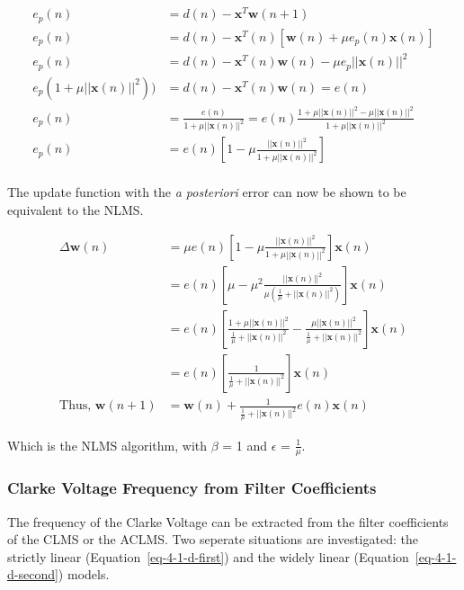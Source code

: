 \documentclass[main.tex]{subfiles}
\begin{document}
\begin{align*}
e_p(n) &= d(n) - \textbf{x}^T\textbf{w}(n+1)\\
e_p(n) &= d(n) - \textbf{x}^T(n)\left[\textbf{w}(n)+\mu e_p(n)\textbf{x}(n)\right]\\
e_p(n) &= d(n) - \textbf{x}^T(n)\textbf{w}(n) - \mu e_p||\textbf{x}(n)||^2\\
e_p(1+\mu||\textbf{x}(n)||^2)) &= d(n)-\textbf{x}^T(n)\textbf{w}(n) = e(n)\\
e_p(n) &= \frac{e(n)}{1+\mu||\textbf{x}(n)||^2} = e(n)\frac{1+\mu||\textbf{x}(n)||^2-\mu||\textbf{x}(n)||^2}{1+\mu||\textbf{x}(n)||^2}\\
e_p(n) &= e(n)\left[1 - \mu\frac{||\textbf{x}(n)||^2}{1+\mu||\textbf{x}(n)||^2}\right]\\
\end{align*}

The update function with the \textit{a posteriori} error can now be shown to be equivalent to the NLMS.

\begin{align*}
\Delta \textbf{w}(n) &= \mu e(n)\left[1-\mu\frac{||\textbf{x}(n)||^2}{1+\mu||\textbf{x}(n)||^2}\right]\textbf{x}(n)\\
&= e(n)\left[\mu-\mu^2\frac{||\textbf{x}(n)||^2}{\mu\left(\frac{1}{\mu}+||\textbf{x}(n)||^2\right)}\right]\textbf{x}(n)\\
&= e(n)\left[\frac{1+\mu||\textbf{x}(n)||^2}{\frac{1}{\mu}+||\textbf{x}(n)||^2}-\frac{\mu||\textbf{x}(n)||^2}{\frac{1}{\mu}+||\textbf{x}(n)||^2}\right]\textbf{x}(n)\\
&= e(n)\left[\frac{1}{\frac{1}{\mu}+||\textbf{x}(n)||^2}\right]\textbf{x}(n)\\
\text{Thus,\ \ } \textbf{w}(n+1) &= \textbf{w}(n) + \frac{1}{\frac{1}{\mu}+||\textbf{x}(n)||^2}e(n)\textbf{x}(n)
\end{align*}

Which is the NLMS algorithm, with $\beta$ = 1 and $\epsilon$ = $\frac{1}{\mu}$.







\subsubsection{Clarke Voltage Frequency from Filter Coefficients}


The frequency of the Clarke Voltage can be extracted from the filter coefficients of the CLMS or the ACLMS. Two seperate situations are investigated: the strictly linear (Equation~\ref{eq-4-1-d-first}) and the widely linear (Equation~\ref{eq-4-1-d-second}) models.
\end{document}

